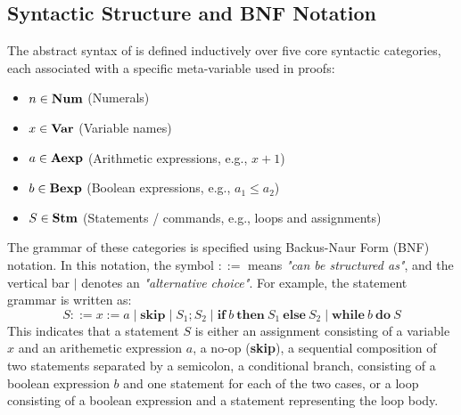 \subsection*{Syntactic Structure and BNF Notation}
The abstract syntax of \While is defined inductively
over five core syntactic categories, each associated
with a specific meta-variable used in proofs:
\begin{itemize}
    \item $n \in \textbf{Num}$ (Numerals)
    \item $x \in \textbf{Var}$ (Variable names)
    \item $a \in \textbf{Aexp}$ (Arithmetic expressions, e.g., $x + 1$)
    \item $b \in \textbf{Bexp}$ (Boolean expressions, e.g., $a_1 \leq a_2$)
    \item $S \in \textbf{Stm}$ (Statements / commands, e.g., loops and assignments)
\end{itemize}
The grammar of these categories is specified using
Backus-Naur Form (BNF) notation. In this notation,
the symbol
\mbox{\(::=\)} means \emph{"can be structured as"},
and the vertical bar
\mbox{\(\mid\)} denotes an \emph{"alternative choice"}.
For example, the statement grammar is written as:
\[
S ::= x := a \mid \mathbf{skip} \mid S_1; S_2 \mid \mathbf{if}\ b\ \mathbf{then}\ S_1\ \mathbf{else}\ S_2 \mid \mathbf{while}\ b\ \mathbf{do}\ S
\]
This indicates that a statement $S$ is either
an assignment consisting of a variable \(x\) and an arithemetic expression \(a\),
a no-op (\textbf{skip}),
a sequential composition of two statements separated by a semicolon,
a conditional branch, consisting of a boolean expression \(b\) and one statement for each of the two cases,
or a loop consisting of a boolean expression and a statement representing the loop body.

